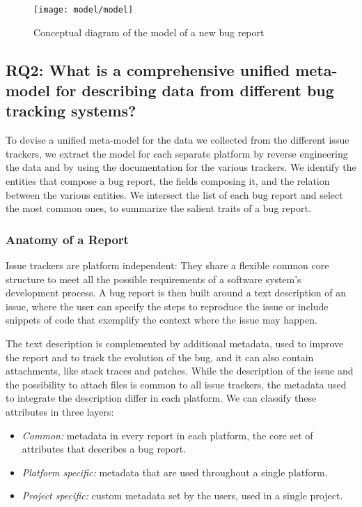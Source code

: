 \begin{figure*}[ht]
\centering
\texttt{[image: model/model]}
\caption{Conceptual diagram of the model of a new bug report}
\label{fig:model}
\end{figure*}

\subsection*{RQ2: What is a comprehensive unified meta-model for describing data from different bug tracking systems?}\label{sec:model-model}

To devise a unified meta-model for the data we collected from the different issue trackers, we extract the model for each separate platform by reverse engineering the data and by using the documentation for the various trackers.
We identify the entities that compose a bug report, the fields  composing it, and the relation between the various entities.
We intersect the list of each bug report and select the most common ones, to summarize the salient traits of a bug report.


\subsubsection{Anatomy of a Report}
Issue trackers are platform independent: They share a flexible common core structure to meet all the possible requirements of a software system's development process.
A bug report is then built around a text description of an issue, where the user can specify the steps to reproduce the issue or include snippets of code that exemplify the context where the issue may happen.

The text description is complemented by additional metadata, used to improve the report and to track the evolution of the bug, and it can also contain attachments, like stack traces and patches.
While the description of the issue and the possibility to attach files is common to all issue trackers, the metadata used to integrate the description differ in each platform.
We can classify these attributes in three layers:

\begin{itemize}[$\circ$]
 \item \textit{Common:} metadata in every report in each platform, \ie the core set of attributes that describes a bug report.
 \item \textit{Platform specific:} metadata that are used throughout a single platform.
 \item \textit{Project specific:} custom metadata set by the users, used in a single project.
\end{itemize}


